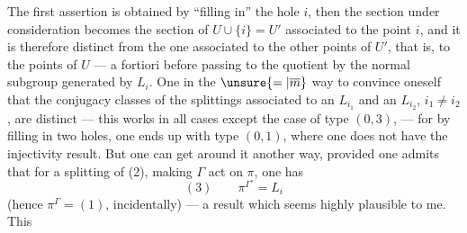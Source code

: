 The first assertion is obtained by ``filling in'' the hole $i$, then the section under consideration becomes the section of $U\cup\{i\}=U'$ associated to the point $i$, and it is therefore distinct from the one associated to the  other points of $U'$, that is, to the points of $U$ --- a fortiori before passing to the quotient by the normal subgroup generated by $L_i$. One  in the $\unsure{=|\overline m}$ way to convince oneself that the conjugacy classes of the splittings associated to an $L_{i_1}$ and an $L_{i_2}$, $i_1\ne i_2$, are distinct --- this works in all cases except the case of type $(0,3)$, --- for by filling in two holes, one ends up with type $(0,1)$, where one does not have the injectivity result. But one can get around it another way, provided one admits that for a splitting of (2), making $\Gamma$ act on $\pi$, one has
\[
(3)\qquad\pi^{\Gamma^\circ}=L_i
\]
(hence $\pi^\Gamma=(1)$, incidentally) --- a result which seems highly plausible to me. This
